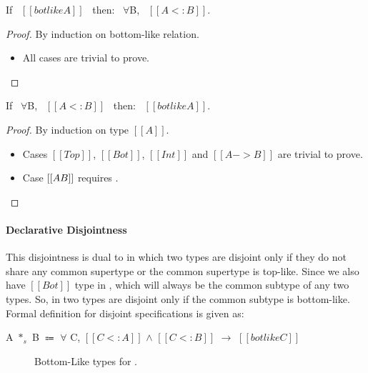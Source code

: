 \begin{lemma}
\label{lemma:union:bl-soundness}
  If \ $[[botlike A]]$ \ then: \ $\forall$B, \ $[[A <: B]]$.
\end{lemma}

\begin{proof}
  By induction on bottom-like relation.
  \begin{itemize}
    \item All cases are trivial to prove.
  \end{itemize}
\end{proof}

\begin{lemma}
\label{lemma:union:bl-completeness}
  If \ $\forall$B, \ $[[A <: B]]$ \ then: \ $[[botlike A]]$.
\end{lemma}

\begin{proof}
  By induction on type $[[A]]$.
  \begin{itemize}
    \item Cases $[[Top]]$, $[[Bot]]$, $[[Int]]$ and $[[A -> B]]$ are trivial to prove.
    \item Case $[[A \/ B]]$ requires .
  \end{itemize}
\end{proof}

\paragraph{Declarative Disjointness}
This disjointness is dual to 
 in which two types are disjoint only if they do not
share any common supertype or the common supertype is top-like. Since we also have $[[Bot]]$ type
in \cal, which will always be the common subtype of any two types. So, in \cal two types are
disjoint only if the common subtype is bottom-like.  
Formal definition for disjoint specifications is given as:

\begin{definition}
\label{def:union:disj}
  A $*_s$ B $\Coloneqq$ $\forall$ C, $[[C <: A]]$ $\wedge$ $[[C <: B]]$ $\rightarrow$ $[[botlike C]]$
\end{definition}

\begin{figure}[t]
  \begin{small}
    \centering
  \end{small}
  \caption{Bottom-Like types for \dut.}
  \label{fig:union:bl}
\end{figure}

